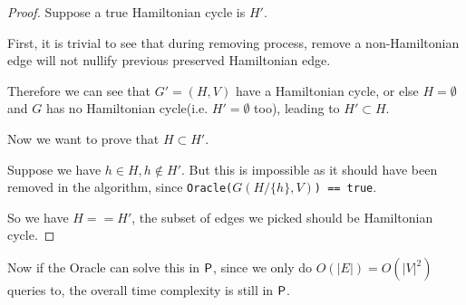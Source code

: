\begin{proof}
Suppose a true Hamiltonian cycle is $H'$.

First, it is trivial to see that during removing process, remove a non-Hamiltonian edge will not nullify previous preserved Hamiltonian edge.

Therefore we can see that $G' = (H, V)$ have a Hamiltonian cycle, or else $H = \emptyset$ and $G$ has no Hamiltonian cycle(i.e. $H' = \emptyset$ too), leading to $H' \subset H$.

Now we want to prove that $H \subset H'$.

Suppose we have $h \in H, h \notin H'$. But this is impossible as it should have been removed in the algorithm, since \texttt{Oracle($G(H / \{h\}, V)$) == true}.

So we have $H == H'$, the subset of edges we picked should be Hamiltonian cycle.

\end{proof}

Now if the Oracle can solve this in $\P$, since we only do $O(|E|) = O(|V|^2)$ queries to, the overall time complexity is still in $\P$. 
